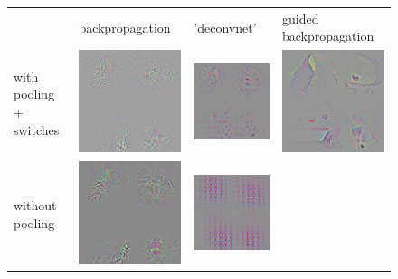 \documentclass{article} %
\begin{document}
\begin{appendix}
\begin{figure}[h]
\begin{center}
\begin{tabular}{ >{\centering\arraybackslash} m{1.5cm} >{\centering\arraybackslash} m{3.5cm} >{\centering\arraybackslash} m{3.5cm} >{\centering\arraybackslash} m{3.5cm} }
   & backpropagation & 'deconvnet' & guided backpropagation \\
  with pooling + switches & 
  \includegraphics[width=.27\textwidth]{cccp8_backprop_max.png} &
  \includegraphics[width=.27\textwidth]{cccp8_zeiler_max.png} &
  \includegraphics[width=.27\textwidth]{cccp8_tobi_max.png} \\
  without pooling & 
  \includegraphics[width=.27\textwidth]{cccp8_backprop_stride.png} &
  \includegraphics[width=.27\textwidth]{cccp8_zeiler_stride.png} &

\end{tabular}
\end{center}
\end{figure}
\end{appendix}
\end{document}
